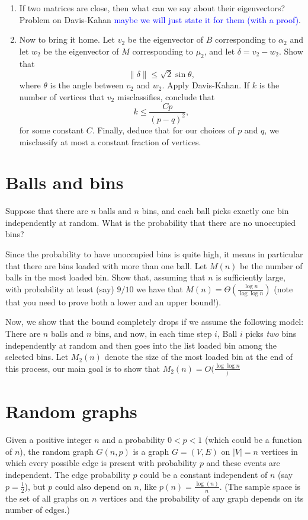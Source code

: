 \documentclass[11pt,letterpaper]{article}
\begin{document}
\begin{enumerate}[a]
	\item If two matrices are close, then what can we say about their eigenvectors? Problem on Davis-Kahan \textcolor{blue}{maybe we will just state it for them (with a proof)}.

	\item Now to bring it home. Let $v_2$ be the eigenvector of $B$ corresponding to $\alpha_2$ and let $w_2$ be the eigenvector of $M$ corresponding to $\mu_2$, and let $\delta = v_2-w_2$. Show that
	\[
	\|\delta\|\leq \sqrt{2}\sin \theta,
	\]
	where $\theta$ is the angle between $v_2$ and $w_2$. Apply Davis-Kahan. If $k$ is the number of vertices that $v_2$ misclassifies, conclude that
	\[
	k\leq \frac{Cp}{(p-q)^2},
	\]
	for some constant $C$. Finally, deduce that for our choices of $p$ and $q$, we misclassify at most a constant fraction of vertices.
\end{enumerate}

\section{Balls and bins} 

Suppose that there are $n$ balls and $n$ bins, and each ball picks exactly one bin independently at random. What is the probability that there are no unoccupied bins? 

Since the probability to have unoccupied bins is quite high, it means in particular that there are bins loaded with more than one ball. Let $M(n)$ be the number of balls in the most loaded bin. Show that, assuming that $n$ is sufficiently large, with probability at least (say) $9/10$ we have that $M(n)=\Theta(\frac{\log n}{\log\log n})$ (note that you need to prove both a lower and an upper bound!). 

Now, we show that the bound completely drops if we assume the following model: There are $n$ balls and $n$ bins, and now, in each time step $i$, Ball $i$ picks \emph{two} bins independently at random and then goes into the list loaded bin among the selected bins. Let $M_2(n)$ denote the size of the most loaded bin at the end of this process, our main goal is to show that $M_2(n)=O(\frac{\log \log n})$




\section{Random graphs} 

Given a positive  integer $n$ and a probability $0<p<1$ (which could be a function of $n$), the random graph $G(n,p)$ is a graph $G=(V,E)$ on $|V|=n$ vertices in which every possible edge is present with probability $p$ and these events are independent. The edge probability $p$ could be a constant independent of $n$ (say $p=\frac{1}{2}$), but $p$ could also depend on $n$, like $p(n)=\frac{\log(n)}{n}$. (The sample space is the set of all graphs on $n$ vertices and the probability of any graph depends on its number of edges.)
\end{document}
